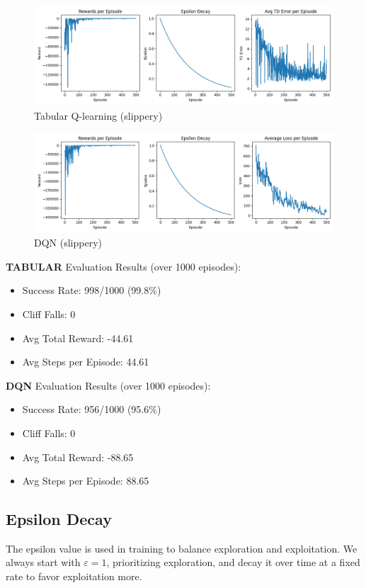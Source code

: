 \documentclass[a4paper,12pt]{article}
\begin{document}
\begin{figure}[H]
    \centering
    \includegraphics[width=\linewidth]{2_32_0995_64_rand_slip_tab.png}
    \caption{Tabular Q-learning (slippery)}
\end{figure}
\begin{figure}[H]
    \centering
    \includegraphics[width=\linewidth]{2_32_0995_64_rand_slip_dqn.png}
    \caption{DQN (slippery)}
\end{figure}
\noindent \textbf{TABULAR} Evaluation Results (over 1000 episodes):
\begin{itemize}
    \item Success Rate: 998/1000 (99.8\%)
    \item Cliff Falls: 0
    \item Avg Total Reward: -44.61
    \item Avg Steps per Episode: 44.61
\end{itemize}
\textbf{DQN} Evaluation Results (over 1000 episodes):
\begin{itemize}
    \item Success Rate: 956/1000 (95.6\%)
    \item Cliff Falls: 0
    \item Avg Total Reward: -88.65
    \item Avg Steps per Episode: 88.65
\end{itemize}

\subsection{Epsilon Decay}
The epsilon value is used in training to balance exploration and exploitation. We always start with $\varepsilon=1$, prioritizing exploration, and decay it over time at a fixed rate to favor exploitation more.\\
\end{document}
